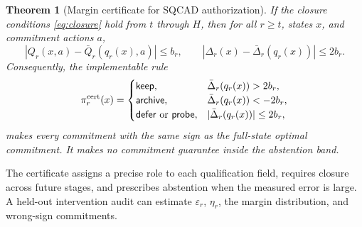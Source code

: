 \documentclass{article}
\newtheorem{theorem}{Theorem}
\newcommand{\keep}{\mathsf{keep}}
\newcommand{\archive}{\mathsf{archive}}
\newcommand{\probe}{\mathsf{probe}}
\newcommand{\defer}{\mathsf{defer}}
\begin{document}
\begin{theorem}[Margin certificate for SQCAD authorization]
\label{thm:certificate}
If the closure conditions \eqref{eq:closure} hold from $t$ through $H$, then for all
$r\ge t$, states $x$, and commitment actions $a$,
\begin{equation}
|Q_r(x,a)-\bar Q_r(q_r(x),a)|\le b_r,\qquad
|\Delta_r(x)-\bar\Delta_r(q_r(x))|\le2b_r.
\label{eq:certificate-bound}
\end{equation}
Consequently, the implementable rule
\begin{equation}
\pi^{\rm cert}_r(x)=
\begin{cases}
\keep,&\bar\Delta_r(q_r(x))>2b_r,\\
\archive,&\bar\Delta_r(q_r(x))<-2b_r,\\
\defer\ \text{or}\ \probe,&|\bar\Delta_r(q_r(x))|\le2b_r,
\end{cases}
\label{eq:cert-policy}
\end{equation}
makes every commitment with the same sign as the full-state optimal commitment. It makes no commitment guarantee inside the abstention band.
\end{theorem}

The certificate assigns a precise role to each qualification field, requires
closure across future stages, and prescribes abstention when the measured error is
large. A held-out intervention audit can estimate $\varepsilon_r$, $\eta_r$, the
margin distribution, and wrong-sign commitments.
\end{document}
